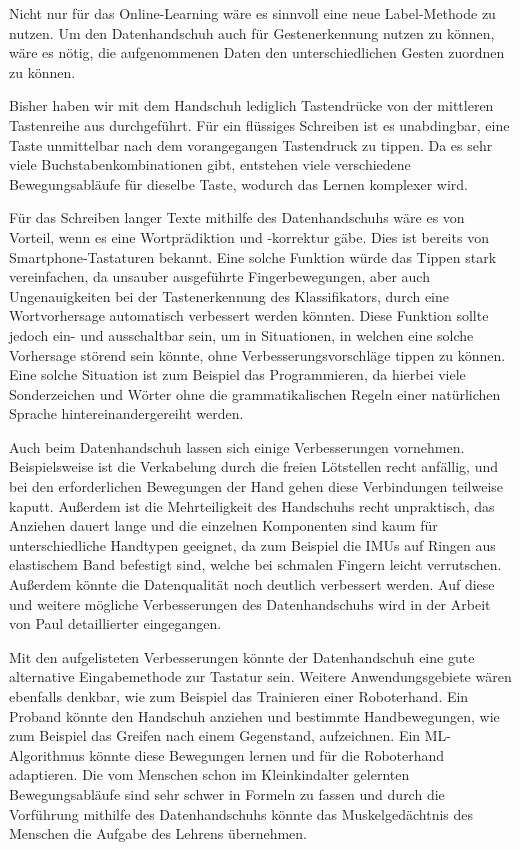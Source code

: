 Nicht nur für das Online-Learning wäre es sinnvoll eine neue Label-Methode zu nutzen. Um den Datenhandschuh auch für Gestenerkennung nutzen zu können, wäre es nötig, die aufgenommenen Daten den unterschiedlichen Gesten zuordnen zu können.

Bisher haben wir mit dem Handschuh lediglich Tastendrücke von der mittleren Tastenreihe aus durchgeführt. Für ein flüssiges Schreiben ist es unabdingbar, eine Taste unmittelbar nach dem vorangegangen Tastendruck zu tippen. Da es sehr viele Buchstabenkombinationen gibt, entstehen viele verschiedene Bewegungsabläufe für dieselbe Taste, wodurch das Lernen komplexer wird.

Für das Schreiben langer Texte mithilfe des Datenhandschuhs wäre es von Vorteil, wenn es eine Wortprädiktion und -korrektur gäbe. Dies ist bereits  von Smartphone-Tastaturen bekannt. Eine solche Funktion würde das Tippen stark vereinfachen, da unsauber ausgeführte Fingerbewegungen, aber auch Ungenauigkeiten bei der Tastenerkennung des Klassifikators, durch eine Wortvorhersage automatisch verbessert werden könnten. Diese Funktion sollte jedoch ein- und ausschaltbar sein, um in Situationen, in welchen eine solche Vorhersage störend sein könnte, ohne Verbesserungsvorschläge tippen zu können. Eine solche Situation ist zum Beispiel das Programmieren, da hierbei viele Sonderzeichen und Wörter ohne die grammatikalischen Regeln einer natürlichen Sprache hintereinandergereiht werden.

Auch beim Datenhandschuh lassen sich einige Verbesserungen vornehmen. Beispielsweise ist die Verkabelung durch die freien Lötstellen recht anfällig, und bei den erforderlichen Bewegungen der Hand gehen diese Verbindungen teilweise kaputt. Außerdem ist die Mehrteiligkeit des Handschuhs recht unpraktisch, das Anziehen dauert lange und die einzelnen Komponenten sind kaum für unterschiedliche Handtypen geeignet, da zum Beispiel die IMUs auf Ringen aus elastischem Band befestigt sind, welche bei schmalen Fingern leicht verrutschen. Außerdem könnte die Datenqualität noch deutlich verbessert werden. Auf diese und weitere mögliche Verbesserungen des Datenhandschuhs wird in der Arbeit von Paul \citet{paul} detaillierter eingegangen.

Mit den aufgelisteten Verbesserungen könnte der Datenhandschuh eine gute alternative Eingabemethode zur Tastatur sein. Weitere Anwendungsgebiete wären ebenfalls denkbar, wie zum Beispiel das Trainieren einer Roboterhand. Ein Proband könnte den Handschuh anziehen und bestimmte Handbewegungen, wie zum Beispiel das Greifen nach einem Gegenstand, aufzeichnen. Ein ML-Algorithmus könnte diese Bewegungen lernen und für die Roboterhand adaptieren. Die vom Menschen schon im Kleinkindalter gelernten Bewegungsabläufe sind sehr schwer in Formeln zu fassen und durch die Vorführung mithilfe des Datenhandschuhs könnte das Muskelgedächtnis des Menschen die Aufgabe des Lehrens übernehmen.
